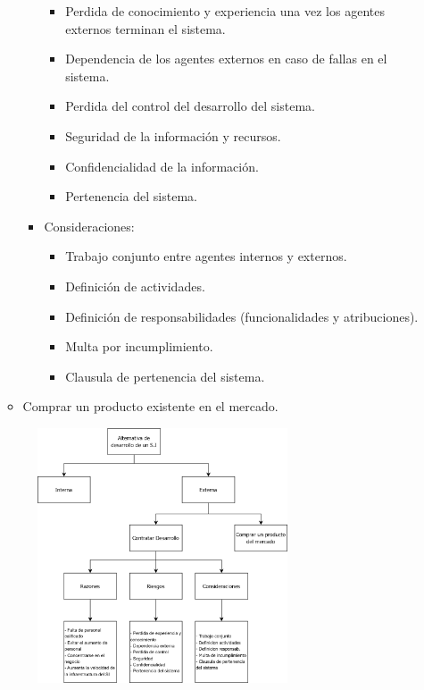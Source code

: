 \documentclass{templateNote}
\begin{document}
\begin{itemize}
\begin{itemize}
\begin{itemize}
            \begin{itemize}
                \item Perdida de conocimiento y experiencia una vez los agentes externos terminan el sistema.
                \item Dependencia de los agentes externos en caso de fallas en el sistema.
                \item Perdida del control del desarrollo del sistema.
                \item Seguridad de la información y recursos.
                \item Confidencialidad de la información.
                \item Pertenencia del sistema.
            \end{itemize}
            \item Consideraciones:
            \begin{itemize}
                \item Trabajo conjunto entre agentes internos y externos.
                \item Definición de actividades.
                \item Definición de responsabilidades (funcionalidades y atribuciones).
                \item Multa por incumplimiento.
                \item Clausula de pertenencia del sistema.
            \end{itemize}
        \end{itemize}
        \item Comprar un producto existente en el mercado.
    \end{itemize}
    \begin{figure}[H]
        \centering
        \includegraphics[width=0.7\textwidth]{img/Alt_des_SI.png}
    \end{figure}
\end{itemize}
\newpage
\end{document}
